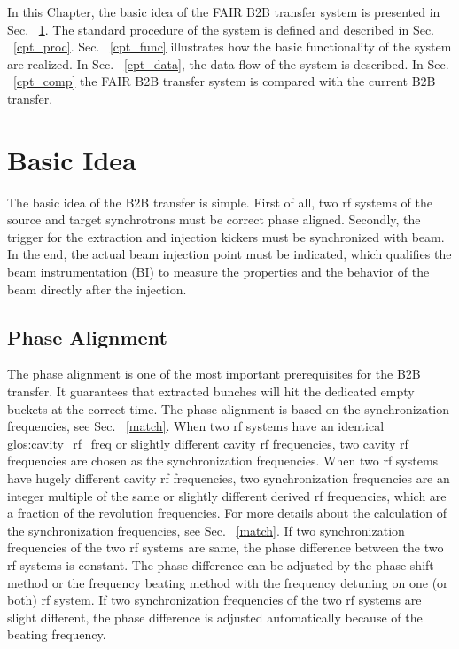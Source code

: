 

In this Chapter, the basic idea of the FAIR B2B transfer system is presented in Sec. ~\ref{cpt_idea}. The standard procedure of the system is defined and described in Sec. ~\ref{cpt_proc}. Sec.  ~\ref{cpt_func} illustrates how the basic functionality of the system are realized. In Sec.  ~\ref{cpt_data}, the data flow of the system is described. In Sec.  ~\ref{cpt_comp} the FAIR B2B transfer system is compared with the current B2B transfer. 

\section{Basic Idea} 
\label{cpt_idea}
The basic idea of the B2B transfer is simple. First of all, two rf systems of the source and target synchrotrons must be correct phase aligned. Secondly, the trigger for the extraction and injection kickers must be synchronized with beam. In the end, the actual beam injection point must be indicated, which qualifies the beam instrumentation (\gls{BI}) to measure the properties and the behavior of the beam directly after the injection. 



\subsection{Phase Alignment}
The phase alignment is one of the most important prerequisites for the B2B transfer. It guarantees that extracted bunches will hit the dedicated empty buckets at the correct time. The phase alignment is based on the synchronization frequencies, see Sec. ~\ref{match}. When two rf systems have an identical \gls{glos:cavity_rf_freq} or slightly different cavity rf frequencies, two cavity rf frequencies are chosen as the synchronization frequencies. When two rf systems have hugely different cavity rf frequencies, two synchronization frequencies are an integer multiple of the same or slightly different derived rf frequencies, which are a fraction of the revolution frequencies. For more details about the calculation of the synchronization frequencies, see Sec. ~\ref{match}. If two synchronization frequencies of the two rf systems are same, the phase difference between the two rf systems is constant. The phase difference can be adjusted by the phase shift method or the frequency beating method with the frequency detuning on one (or both) rf system. If two synchronization frequencies of the two rf systems are slight different, the phase difference is adjusted automatically because of the beating frequency. %

